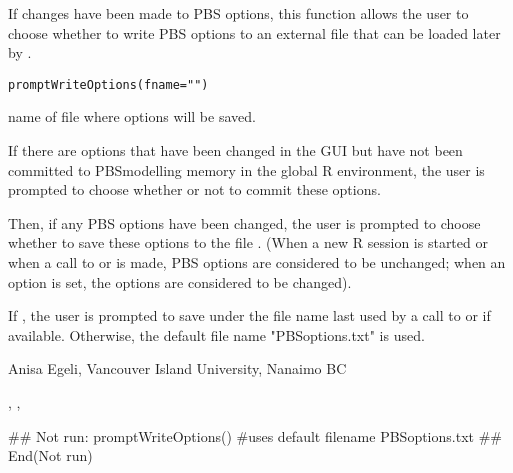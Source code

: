 \documentclass[letterpaper]{book}
\begin{document}
\begin{Description}\relax
If changes have been made to PBS options, this function allows 
the user to choose whether to write PBS options to an external 
file that can be loaded later by .
\end{Description}
\begin{Usage}
\begin{verbatim}
promptWriteOptions(fname="")
\end{verbatim}
\end{Usage}
\begin{Arguments}
\begin{ldescription}
\item[\code{fname}] name of file where options will be saved.
\end{ldescription}
\end{Arguments}
\begin{Details}\relax
If there are options that have been changed in the GUI but have not been
committed to PBSmodelling memory in the global R environment, the user
is prompted to choose whether or not to commit these options.

Then, if any PBS options have been changed, the user is prompted to choose
whether to save these options to the file . (When a new R session is
started or when a call to  or  is made,
PBS options are considered to be unchanged; when an option is set,
the options are considered to be changed).

If , the user is prompted to save under the file name last used 
by a call to  or  if available. 
Otherwise, the default file name "PBSoptions.txt" is used.
\end{Details}
\begin{Author}\relax
Anisa Egeli, Vancouver Island University, Nanaimo BC
\end{Author}
\begin{SeeAlso}\relax
{}, ,
\end{SeeAlso}
\begin{Examples}
\begin{ExampleCode}
## Not run: 
promptWriteOptions() #uses default filename PBSoptions.txt
## End(Not run)
\end{ExampleCode}
\end{Examples}
\end{document}
